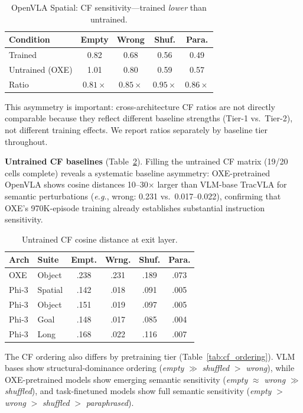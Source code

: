 \documentclass[10pt,twocolumn]{article}
\newcommand{\eg}{\textit{e.g.}}
\begin{document}
\begin{table}[t]
\centering
\caption{OpenVLA Spatial: CF sensitivity---trained \emph{lower} than untrained.}
\label{tab:openvla_spatial_cf}
\small
\begin{tabular}{@{}lcccc@{}}
\toprule
\textbf{Condition} & \textbf{Empty} & \textbf{Wrong} & \textbf{Shuf.} & \textbf{Para.} \\
\midrule
Trained & 0.82 & 0.68 & 0.56 & 0.49 \\
Untrained (OXE) & 1.01 & 0.80 & 0.59 & 0.57 \\
Ratio & $0.81\times$ & $0.85\times$ & $0.95\times$ & $0.86\times$ \\
\bottomrule
\end{tabular}
\end{table}

This asymmetry is important: cross-architecture CF ratios are not directly comparable because they reflect different baseline strengths (Tier-1 vs.\ Tier-2), not different training effects. We report ratios separately by baseline tier throughout.

\textbf{Untrained CF baselines} (Table~\ref{tab:untrained_cf}).
Filling the untrained CF matrix (19/20 cells complete) reveals a systematic baseline asymmetry: OXE-pretrained OpenVLA shows cosine distances 10--30$\times$ larger than VLM-base TracVLA for semantic perturbations (\eg, wrong: 0.231 vs.\ 0.017--0.022), confirming that OXE's 970K-episode training already establishes substantial instruction sensitivity.

\begin{table}[t]
\centering
\caption{Untrained CF cosine distance at exit layer.}
\label{tab:untrained_cf}
\small
\begin{tabular}{@{}llcccc@{}}
\toprule
\textbf{Arch} & \textbf{Suite} & \textbf{Empt.} & \textbf{Wrng.} & \textbf{Shuf.} & \textbf{Para.} \\
\midrule
OXE & Object & .238 & .231 & .189 & .073 \\
Phi-3 & Spatial & .142 & .018 & .091 & .005 \\
Phi-3 & Object & .151 & .019 & .097 & .005 \\
Phi-3 & Goal & .148 & .017 & .085 & .004 \\
Phi-3 & Long & .168 & .022 & .116 & .007 \\
\bottomrule
\end{tabular}
\end{table}

The CF ordering also differs by pretraining tier (Table~\ref{tab:cf_ordering}). VLM bases show structural-dominance ordering (\emph{empty} $\gg$ \emph{shuffled} $>$ \emph{wrong}), while OXE-pretrained models show emerging semantic sensitivity (\emph{empty} $\approx$ \emph{wrong} $\gg$ \emph{shuffled}), and task-finetuned models show full semantic sensitivity (\emph{empty} $>$ \emph{wrong} $>$ \emph{shuffled} $>$ \emph{paraphrased}).
\end{document}

